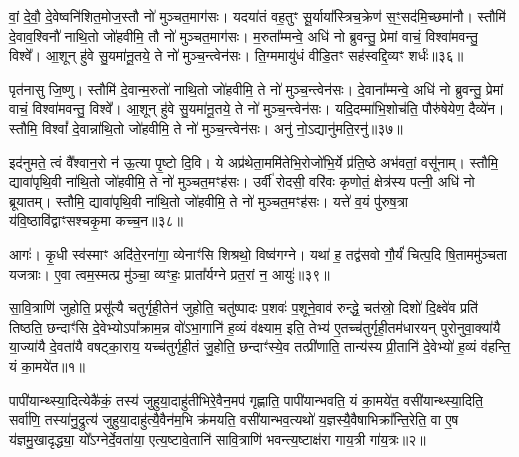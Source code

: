वां॒ दे॒वौ॒ दे॒वेष्वनि॑शित॒मोज॒स्तौ नो॑ मुञ्चत॒माग॑सः। यदया॑तं वह॒तुꣳ सू॒र्याया᳚स्त्रिच॒क्रेण॑ स॒ꣳ॒सद॑मि॒च्छमा॑नौ। स्तौमि॑ दे॒वाव॒श्विनौ॑ नाथि॒तो जो॑हवीमि॒ तौ नो॑ मुञ्चत॒माग॑सः। म॒रुता᳚म्मन्वे॒ अधि॑ नो ब्रुवन्तु॒ प्रेमां वाचं॒ विश्वा॑मवन्तु॒ विश्वे᳚। आ॒शून् हु॑वे सु॒यमा॑नू॒तये॒ ते नो॑ मुञ्च॒न्त्वेन॑सः। ति॒ग्ममायु॑धं वीडि॒तꣳ सह॑स्वद्दि॒व्यꣳ शर्धः॑॥३६॥

पृत॑नासु जि॒ष्णु। स्तौमि॑ दे॒वान्म॒रुतो॑ नाथि॒तो जो॑हवीमि॒ ते नो॑ मुञ्च॒न्त्वेन॑सः। दे॒वाना᳚म्मन्वे॒ अधि॑ नो ब्रुवन्तु॒ प्रेमां वाचं॒ विश्वा॑मवन्तु॒ विश्वे᳚। आ॒शून् हु॑वे सु॒यमा॑नू॒तये॒ ते नो॑ मुञ्च॒न्त्वेन॑सः। यदि॒दम्मा॑भि॒शोच॑ति॒ पौरु॑षेयेण॒ दैव्ये॑न। स्तौमि॒ विश्वां᳚ दे॒वान्ना॑थि॒तो जो॑हवीमि॒ ते नो॑ मुञ्च॒न्त्वेन॑सः। अनु॑ नो॒\-ऽद्यानु॑मति॒रनु॑॥३७॥

इद॑नुमते॒ त्वं वै᳚श्वान॒रो न॑ ऊ॒त्या पृ॒ष्टो दि॒वि। ये अप्र॑थेता॒ममि॑तेभि॒रोजो॑भि॒र्ये प्र॑ति॒ष्ठे अभ॑वतां॒ वसू॑नाम्। स्तौमि॒ द्यावा॑पृथि॒वी ना॑थि॒तो जो॑हवीमि॒ ते नो॑ मुञ्चत॒मꣳह॑सः। उर्वी॑ रोदसी॒ वरि॑वः कृणोतं॒ क्षेत्र॑स्य पत्नी॒ अधि॑ नो ब्रूयातम्। स्तौमि॒ द्यावा॑पृथि॒वी ना॑थि॒तो जो॑हवीमि॒ ते नो॑ मुञ्चत॒मꣳह॑सः। यत्ते॑ व॒यं पु॑रुष॒त्रा य॑वि॒ष्ठावि॑द्वाꣳसश्चकृ॒मा कच्च॒न॥३८॥

आगः॑। कृ॒धी स्व॑स्माꣳ अदि॑ते॒रना॑गा॒ व्येनाꣳ॑सि शिश्रथो॒ विष्व॑गग्ने। यथा॑ ह॒ तद्व॑सवो गौ॒र्यं॑ चित्प॒दि षि॒ताममु॑ञ्चता यजत्राः। ए॒वा त्वम॒स्मत्प्र मु॑ञ्चा॒ व्यꣳहः॒ प्राता᳚र्यग्ने प्रत॒रां न॒ आयुः॑॥३९॥


{\anuvakamend[{गन्ता॑ दू॒षय॒न्थ्स्तौमि॒ ययोः॒ शर्धो\-ऽनु॑मति॒रनु॑ च॒न चतु॑स्त्रिꣳशच्च॥15॥}]}

{\anuvakamend[{अ॒ग्निष्ट्वा॑ वा॒मश्वो॒ द्विच॑त्वारिꣳशच्च॥11॥}]}

\setcounter{anuvakam}{0}
सा॒वि॒त्राणि॑ जुहोति॒ प्रसू᳚त्यै चतुर्गृही॒तेन॑ जुहोति॒ चतु॑ष्पादः प॒शवः॑ प॒शूने॒वाव॑ रुन्द्धे॒ चत॑स्रो॒ दिशो॑ दि॒क्ष्वे॑व प्रति॑ तिष्ठति॒ छन्दाꣳ॑सि दे॒वेभ्यो\-ऽपा᳚क्राम॒न्न वो॑\-ऽभा॒गानि॑ ह॒व्यं व॑क्ष्याम॒ इति॒ तेभ्य॑ ए॒तच्च॑तुर्गृही॒तम॑धारयन् पुरोनुवा॒क्या॑यै या॒ज्या॑यै दे॒वता॑यै वषट्का॒राय॒ यच्च॑तुर्गृही॒तं जु॒होति॒ छन्दाꣳ॑स्ये॒व तत्प्री॑णाति॒ तान्य॑स्य प्री॒तानि॑ दे॒वेभ्यो॑ ह॒व्यं व॑हन्ति॒ यं का॒मये॑त॥१॥

पापी॑यान्थ्स्या॒दित्येकै॑कं॒ तस्य॑ जुहुया॒दाहु॑तीभिरे॒वैन॒मप॑ गृह्णाति॒ पापी॑यान्भवति॒ यं का॒मये॑त॒ वसी॑यान्थ्स्या॒दिति॒ सर्वा॑णि॒ तस्या॑नु॒द्रुत्य॑ जुहुया॒दाहु॑त्यै॒वैन॑म॒भि क्र॑मयति॒ वसी॑यान्भव॒त्यथो॑ य॒ज्ञस्यै॒वैषाभिक्रा᳚न्ति॒रेति॒ वा ए॒ष य॑ज्ञमु॒खादृद्ध्या॒ यो᳚\-ऽग्नेर्दे॒वता॑या॒ एत्य॒ष्टावे॒तानि॑ सावि॒त्राणि॑ भवन्त्य॒ष्टाक्ष॑रा गाय॒त्री गा॑य॒त्रः॥२॥

